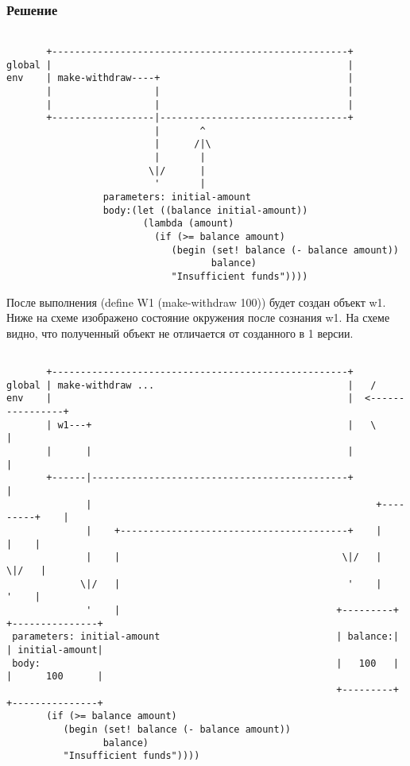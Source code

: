 \documentclass[10pt,a4paper]{article}
\begin{document}
\subsubsection*{Решение}
\newpage
\lstset{ %
basicstyle=\footnotesize,       %
frame=single
}
\begin{lstlisting}

       +----------------------------------------------------+
global |                                                    |
env    | make-withdraw----+                                 |
       |                  |                                 |
       |                  |                                 |
       +------------------|---------------------------------+
                          |       ^
                          |      /|\
                          |       |
                         \|/      |
                          '       |
                 parameters: initial-amount
                 body:(let ((balance initial-amount))
                        (lambda (amount)
                          (if (>= balance amount)
                             (begin (set! balance (- balance amount))
                                    balance)
                             "Insufficient funds"))))

\end{lstlisting}

После выполнения (define W1 (make-withdraw 100)) будет создан объект
w1. Ниже на схеме изображено состояние окружения после сознания w1. На
схеме видно, что полученный объект не отличается от созданного в 1 версии.

\begin{lstlisting}

       +----------------------------------------------------+
global | make-withdraw ...                                  |   /
env    |                                                    |  <----------------+
       | w1---+                                             |   \               |
       |      |                                             |                   |
       +------|---------------------------------------------+                   |
              |                                                  +---------+    |
              |    +----------------------------------------+    |         |    |
              |    |                                       \|/   |        \|/   |
             \|/   |                                        '    |         '    |
              '    |                                      +---------+ +---------------+
 parameters: initial-amount                               | balance:| | initial-amount|
 body:                                                    |   100   | |      100      |
                                                          +---------+ +---------------+
       (if (>= balance amount)
          (begin (set! balance (- balance amount))
                 balance)
          "Insufficient funds"))))

\end{lstlisting}
\end{document}
